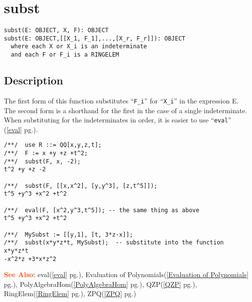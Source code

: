\documentclass[a4paper]{mybook}
\newenvironment{command}{}{} %
\newcommand\SeeAlso{\par\textcolor{OrangeRed}{\textbf{\large See Also: }}}
\begin{document}
\section{subst}
\label{subst}
\begin{command} %


\begin{Verbatim}[label=syntax, rulecolor=\color{MidnightBlue},
frame=single]
subst(E: OBJECT, X, F): OBJECT
subst(E: OBJECT,[[X_1, F_1],...,[X_r, F_r]]): OBJECT
  where each X or X_i is an indeterminate
  and each F or F_i is a RINGELEM
\end{Verbatim}


\subsection*{Description}

The first form of this function substitutes ``\verb&F_i&'' for ``\verb&X_i&'' in the
expression E.  The second form is a shorthand for the first in the
case of a single indeterminate.  When substituting for the
indeterminates in order, it is easier to use ``\verb&eval&'' (\ref{eval} pg.\pageref{eval}).
\begin{Verbatim}[label=example, rulecolor=\color{PineGreen}, frame=single]
/**/  use R ::= QQ[x,y,z,t];
/**/  F := x +y +z +t^2;
/**/  subst(F, x, -2);
t^2 +y +z -2

/**/  subst(F, [[x,x^2], [y,y^3], [z,t^5]]);
t^5 +y^3 +x^2 +t^2

/**/  eval(F, [x^2,y^3,t^5]); -- the same thing as above
t^5 +y^3 +x^2 +t^2

/**/  MySubst := [[y,1], [t, 3*z-x]];
/**/  subst(x*y*z*t, MySubst);  -- substitute into the function x*y*z*t
-x^2*z +3*x*z^2
\end{Verbatim}


\SeeAlso %
  eval(\ref{eval} pg.\pageref{eval}), 
    Evaluation of Polynomials(\ref{Evaluation of Polynomials} pg.\pageref{Evaluation of Polynomials}), 
    PolyAlgebraHom(\ref{PolyAlgebraHom} pg.\pageref{PolyAlgebraHom}), 
    QZP(\ref{QZP} pg.\pageref{QZP}), 
    RingElem(\ref{RingElem} pg.\pageref{RingElem}), 
    ZPQ(\ref{ZPQ} pg.\pageref{ZPQ})
\end{command} %
\end{document}
